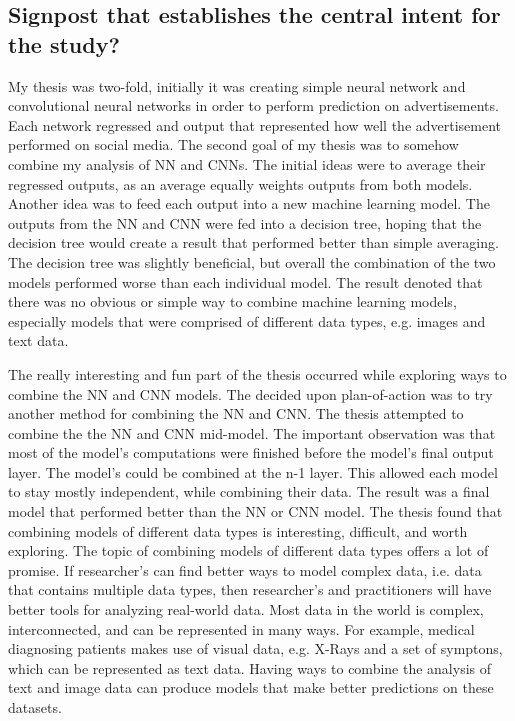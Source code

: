 \subsection{Signpost that establishes the central intent for the study?}

My thesis was two-fold, initially it was creating simple neural network and convolutional neural networks in order to perform prediction on advertisements.
Each network regressed and output that represented how well the advertisement performed on social media.  The second goal of my thesis was to somehow combine my analysis of NN and CNNs.
The initial ideas were to average their regressed outputs, as an average equally weights outputs from both models.  Another idea was to feed each output into a new machine learning model.  The outputs from the NN and CNN were fed into a decision tree,
hoping that the decision tree would create a result that performed better than simple averaging.  The decision tree was slightly beneficial, but overall the combination of the two models performed worse than each individual model.
The result denoted that there was no obvious or simple way to combine machine learning models, especially models that were comprised of different data types, e.g. images and text data.

The really interesting and fun part of the thesis occurred while exploring ways to combine the NN and CNN models.  The decided upon plan-of-action was to try another method for combining the NN and CNN.
The thesis attempted to combine the the NN and CNN mid-model.  The important observation was that most of the model's computations were finished before the model's final output layer.
The model's could be combined at the n-1 layer.  This allowed each model to stay mostly independent, while combining their data.  The result was a final model that performed better than the NN or CNN model.  The thesis found that combining models of different data types is interesting, difficult, and worth exploring.  The topic of combining models of different data types offers a lot of promise.  If researcher's can find better ways to model complex data, i.e. data that contains multiple data types, then researcher's and practitioners will have better tools for analyzing real-world data.  Most data in the world is complex, interconnected, and can be represented in many ways.  For example, medical diagnosing patients makes use of visual data, e.g. X-Rays and a set of symptons, which can be represented as text data.  Having ways to combine the analysis of text and image data can produce models that make better predictions on these datasets.


